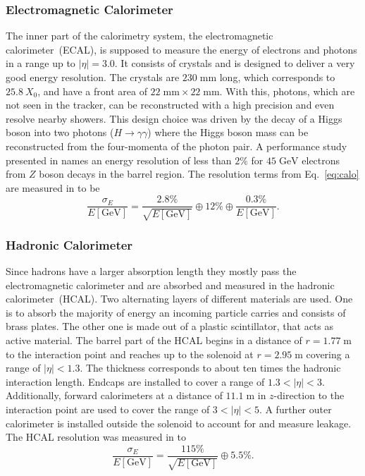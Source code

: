 \subsubsection{Electromagnetic Calorimeter}
	The inner part of the calorimetry system, the electromagnetic calorimeter~(ECAL), is supposed to measure the energy of electrons and photons in a range up to $|\eta| = 3.0$. It consists of  crystals and is designed to deliver a very good energy resolution. The crystals are $230\;\text{mm}$ long, which corresponds to $25.8~X_0$, and have a front area of $22\;\text{mm} \times 22\;\text{mm}$. With this, photons, which are not seen in the tracker, can be reconstructed with a high precision and even resolve nearby showers. This design choice was driven by the decay of a Higgs boson into two photons ($H\rightarrow \gamma \gamma$) where the Higgs boson mass can be reconstructed from the four-momenta of the photon pair. A performance study presented in \cite{EGammaPerformance} names an energy resolution of less than $2\%$ for $45\;\text{GeV}$ electrons from $Z$ boson decays in the barrel region. The resolution terms from Eq.~\ref{eq:calo} are measured in \cite{CMSdetector} to be
	\begin{equation}
	\frac{\sigma_E}{E\left[\text{GeV}\right]} = \frac{2.8\%}{\sqrt{E\left[\text{GeV}\right]}} \oplus 12\% \oplus \frac{0.3\%}{E\left[\text{GeV}\right]}.
	\end{equation}
\subsubsection{Hadronic Calorimeter}
	Since hadrons have a larger absorption length they mostly pass the electromagnetic calorimeter and are absorbed and measured in the hadronic calorimeter~(HCAL). Two alternating layers of different materials are used. One is to absorb the majority of energy an incoming particle carries and consists of brass plates. The other one is made out of a plastic scintillator, that acts as active material. The barrel part of the HCAL begins in a distance of $r=1.77\;\text{m}$ to the interaction point and reaches up to the solenoid at $r=2.95\;\text{m}$ covering a range of $|\eta| < 1.3$. The thickness corresponds to about ten times the hadronic interaction length. Endcaps are installed to cover a range of $1.3 < |\eta| < 3$. Additionally, forward calorimeters at a distance of $11.1\;\text{m}$ in $z$-direction to the interaction point are used to cover the range of $3 < |\eta| < 5$. A further outer calorimeter is installed outside the solenoid to account for and measure leakage. The HCAL resolution was measured in \cite{HCALperf} to
 	\begin{equation}
 	\frac{\sigma_E}{E\left[\text{GeV}\right]} = \frac{115\%}{\sqrt{E\left[\text{GeV}\right]}} \oplus 5.5\%.
 	\end{equation}
